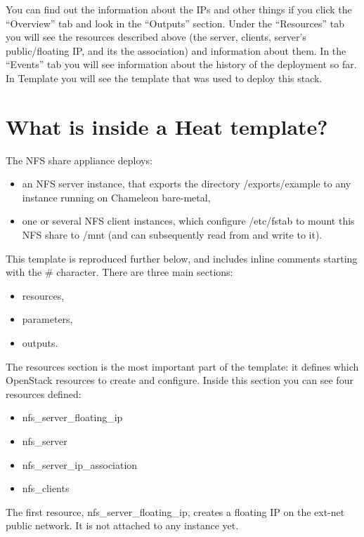 You can find out the information about the IPs and other things if you
click the ``Overview'' tab and look in the ``Outputs'' section. Under
the ``Resources'' tab you will see the resources described above (the
server, clients, server's public/floating IP, and its the association)
and information about them. In the ``Events'' tab you will see
information about the history of the deployment so far. In Template you
will see the template that was used to deploy this stack.

\section{What is inside a Heat
template?}\label{what-is-inside-a-heat-template}

The NFS share appliance deploys:

\begin{itemize}
\item
  an NFS server instance, that exports the directory /exports/example to
  any instance running on Chameleon bare-metal,
\item
  one or several NFS client instances, which configure /etc/fstab to
  mount this NFS share to /mnt (and can subsequently read from and write
  to it).
\end{itemize}

This template is reproduced further below, and includes inline comments
starting with the \# character. There are three main sections:

\begin{itemize}
\item
  resources,
\item
  parameters,
\item
  outputs.
\end{itemize}

The resources section is the most important part of the template: it
defines which OpenStack resources to create and configure. Inside this
section you can see four resources defined:

\begin{itemize}
\item
  nfs\_server\_floating\_ip
\item
  nfs\_server~
\item
  nfs\_server\_ip\_association
\item
  nfs\_clients
\end{itemize}

The first resource, nfs\_server\_floating\_ip, creates a floating IP on
the ext-net public network. It is not attached to any instance yet.

